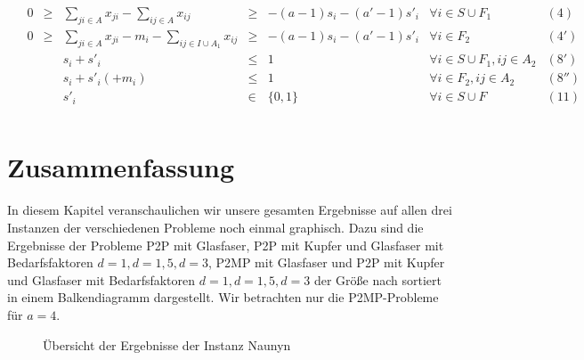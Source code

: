 \documentclass[11pt,a4paper]{article}
\theoremstyle{my_th_style1}
\begin{document}
  \begin{align*}
  \begin{array}{rcrcrcll}
  &0&\geq&\displaystyle\sum_{ji \in A} x_{ji} - \displaystyle\sum_{ij \in A} x_{ij}&\geq& -(a-1)s_i -(a'-1)s'_i & \forall i \in S \cup F_1& (4)\\
  &0&\geq&\displaystyle\sum_{ji \in A} x_{ji} -m_i - \displaystyle\sum_{ij \in I \cup A_1} x_{ij}&\geq& -(a-1)s_i -(a'-1)s'_i & \forall i \in F_2& (4')\\
    &&&s_i+s'_i & \leq &1 & \forall i \in S \cup F_1,ij\in A_2& (8')\\
  &&&s_i+s'_i(+m_i) & \leq &1 & \forall i \in F_2,ij\in A_2 &   (8'')\\
  &&& s'_i & \in & \{ 0,1 \} & \forall i \in S \cup F & (11) \\
  \end{array}
  \end{align*}

 
 \section{Zusammenfassung}
In diesem Kapitel veranschaulichen wir unsere gesamten Ergebnisse auf allen drei Instanzen der verschiedenen Probleme noch einmal graphisch. Dazu sind die Ergebnisse der Probleme P2P mit Glasfaser, P2P mit Kupfer und Glasfaser mit Bedarfsfaktoren $d=1, d=1,5, d=3$, P2MP mit Glasfaser und P2P mit Kupfer und Glasfaser mit Bedarfsfaktoren $d=1, d=1,5, d=3$ der Größe nach sortiert in einem Balkendiagramm dargestellt. Wir betrachten nur die P2MP-Probleme für $a=4$.

  \begin{figure}[!htbp]
 	\caption{\"Ubersicht der Ergebnisse der Instanz Naunyn}
 \end{figure}
 
\end{document}
